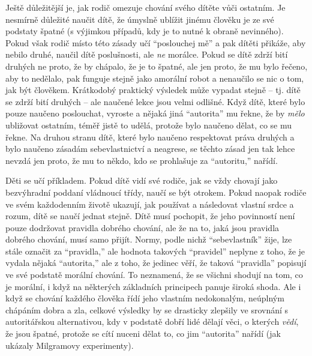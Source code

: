 \documentclass{book}
\begin{document}
Ještě důležitější je, jak rodič omezuje chování svého dítěte vůči ostatním. Je nesmírně důležité naučit dítě, že úmyslně ublížit jinému člověku je ze své podstaty špatné (s výjimkou případů, kdy je to nutné k obraně nevinného). Pokud však rodič místo této zásady učí \enquote{poslouchej mě} a pak dítěti přikáže, aby nebilo druhé, naučil dítě poslušnosti, ale \emph{ne} morálce. Pokud se dítě zdrží bití druhých ne proto, že by chápalo, že je to špatné, ale jen proto, že mu bylo řečeno, aby to nedělalo, pak funguje stejně jako amorální robot a nenaučilo se nic o tom, jak být člověkem. Krátkodobý praktický výsledek může vypadat stejně -- tj. dítě se zdrží bití druhých -- ale naučené lekce jsou velmi odlišné. Když dítě, které bylo pouze naučeno poslouchat, vyroste a nějaká jiná \enquote{autorita} mu řekne, že by \emph{mělo} ubližovat ostatním, téměř jistě to udělá, protože bylo naučeno dělat, co se mu řekne. Na druhou stranu dítě, které bylo naučeno respektovat práva druhých a bylo naučeno zásadám sebevlastnictví a neagrese, se těchto zásad jen tak lehce nevzdá jen proto, že mu to někdo, kdo se prohlašuje za \enquote{autoritu,} nařídí.

Děti se učí příkladem. Pokud dítě vidí své rodiče, jak se vždy chovají jako bezvýhradní poddaní vládnoucí třídy, naučí se být otrokem. Pokud naopak rodiče ve svém každodenním životě ukazují, jak používat a následovat vlastní srdce a rozum, dítě se naučí jednat stejně. Dítě musí pochopit, že jeho povinností není pouze dodržovat pravidla dobrého chování, ale že na to, jaká jsou pravidla dobrého chování, musí samo přijít. Normy, podle nichž \enquote{sebevlastník} žije, lze stále označit za \enquote{pravidla,} ale hodnota takových \enquote{pravidel} neplyne z toho, že je vydala nějaká \enquote{autorita,} ale z toho, že jedinec věří, že taková \enquote{pravidla} popisují ve své podstatě morální chování. To neznamená, že se všichni shodují na tom, co je morální, i když na některých základních principech panuje široká shoda. Ale i když se chování každého člověka řídí jeho vlastním nedokonalým, neúplným chápáním dobra a zla, celkové výsledky by se drasticky zlepšily ve srovnání s autoritářskou alternativou, kdy v podstatě dobří lidé dělají věci, o kterých \emph{vědí}, že jsou špatné, protože se cítí nuceni dělat to, co jim \enquote{autorita} nařídí (jak ukázaly Milgramovy experimenty).
\end{document}
